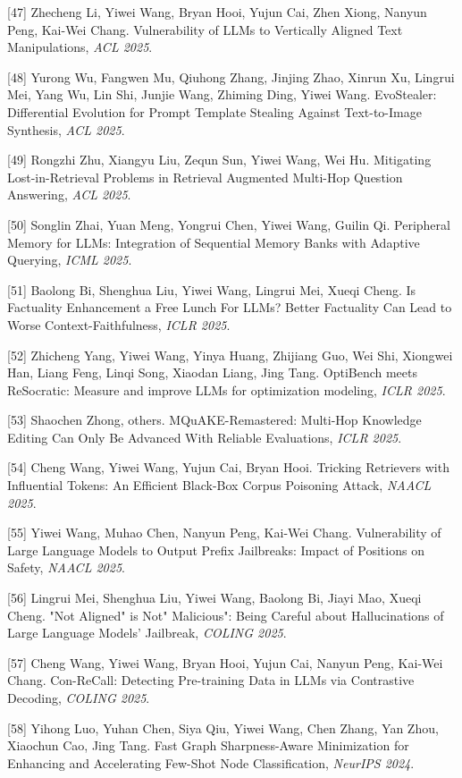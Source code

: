 [47] Zhecheng Li, Yiwei Wang, Bryan Hooi, Yujun Cai, Zhen Xiong, Nanyun Peng, Kai-Wei Chang. Vulnerability of LLMs to Vertically Aligned Text Manipulations, \textit{ACL 2025}.

[48] Yurong Wu, Fangwen Mu, Qiuhong Zhang, Jinjing Zhao, Xinrun Xu, Lingrui Mei, Yang Wu, Lin Shi, Junjie Wang, Zhiming Ding, Yiwei Wang. EvoStealer: Differential Evolution for Prompt Template Stealing Against Text-to-Image Synthesis, \textit{ACL 2025}.

[49] Rongzhi Zhu, Xiangyu Liu, Zequn Sun, Yiwei Wang, Wei Hu. Mitigating Lost-in-Retrieval Problems in Retrieval Augmented Multi-Hop Question Answering, \textit{ACL 2025}.

[50] Songlin Zhai, Yuan Meng, Yongrui Chen, Yiwei Wang, Guilin Qi. Peripheral Memory for LLMs: Integration of Sequential Memory Banks with Adaptive Querying, \textit{ICML 2025}.

[51] Baolong Bi, Shenghua Liu, Yiwei Wang, Lingrui Mei, Xueqi Cheng. Is Factuality Enhancement a Free Lunch For LLMs? Better Factuality Can Lead to Worse Context-Faithfulness, \textit{ICLR 2025}.

[52] Zhicheng Yang, Yiwei Wang, Yinya Huang, Zhijiang Guo, Wei Shi, Xiongwei Han, Liang Feng, Linqi Song, Xiaodan Liang, Jing Tang. OptiBench meets ReSocratic: Measure and improve LLMs for optimization modeling, \textit{ICLR 2025}.

[53] Shaochen Zhong, others. MQuAKE-Remastered: Multi-Hop Knowledge Editing Can Only Be Advanced With Reliable Evaluations, \textit{ICLR 2025}.

[54] Cheng Wang, Yiwei Wang, Yujun Cai, Bryan Hooi. Tricking Retrievers with Influential Tokens: An Efficient Black-Box Corpus Poisoning Attack, \textit{NAACL 2025}.

[55] Yiwei Wang, Muhao Chen, Nanyun Peng, Kai-Wei Chang. Vulnerability of Large Language Models to Output Prefix Jailbreaks: Impact of Positions on Safety, \textit{NAACL 2025}.

[56] Lingrui Mei, Shenghua Liu, Yiwei Wang, Baolong Bi, Jiayi Mao, Xueqi Cheng. "Not Aligned" is Not" Malicious": Being Careful about Hallucinations of Large Language Models' Jailbreak, \textit{COLING 2025}.

[57] Cheng Wang, Yiwei Wang, Bryan Hooi, Yujun Cai, Nanyun Peng, Kai-Wei Chang. Con-ReCall: Detecting Pre-training Data in LLMs via Contrastive Decoding, \textit{COLING 2025}.

[58] Yihong Luo, Yuhan Chen, Siya Qiu, Yiwei Wang, Chen Zhang, Yan Zhou, Xiaochun Cao, Jing Tang. Fast Graph Sharpness-Aware Minimization for Enhancing and Accelerating Few-Shot Node Classification, \textit{NeurIPS 2024}.

